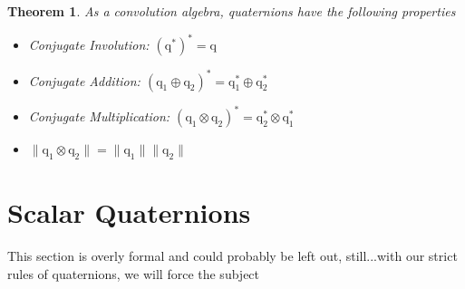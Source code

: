 \documentclass{amsart}
\newtheorem{theorem}{Theorem}[section]
\theoremstyle{definition}
\theoremstyle{remark}
\numberwithin{equation}{section}
\begin{document}
\begin{theorem}
	As a convolution algebra, quaternions have the following properties
	\begin{itemize}
	\item Conjugate Involution: $(\mathrm{q}^*)^*=\mathrm{q}$
	\item Conjugate Addition: $(\mathrm{q}_1\oplus\mathrm{q}_2)^*=\mathrm{q}_1^*\oplus\mathrm{q}_2^*$
	\item Conjugate Multiplication: $(\mathrm{q}_1\otimes\mathrm{q}_2)^*=\mathrm{q}_2^*\otimes\mathrm{q}_1^*$
	\item $\|\mathrm{q}_1\otimes \mathrm{q}_2\| = \|\mathrm{q}_1\|\|\mathrm{q}_2\|$
	\end{itemize}
\end{theorem}


\section{Scalar Quaternions}
This section is overly formal and could probably be left out, still...with our strict rules of quaternions, we will force the subject
\end{document}
